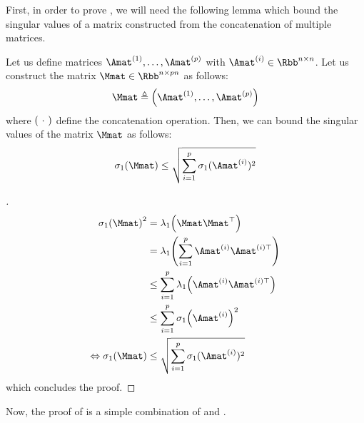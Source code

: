 First, in order to prove , we will need the following lemma which bound the singular values of a matrix constructed from the concatenation of multiple matrices.
\begin{lemma} \label{theorem:ch2-bound_concatenation_matrices}
  Let us define matrices $\Amat^{(1)}, \dots, \Amat^{(p)}$ with $\Amat^{(i)} \in \Rbb^{n \times n}$. Let us construct the matrix $\Mmat \in \Rbb^{n \times pn}$ as follows:
  \begin{equation}
    \Mmat \triangleq \leftmat \Amat^{(1)}, \dots, \Amat^{(p)} \rightmat
  \end{equation}
  where $\leftmat\ \cdot\ \rightmat$ define the concatenation operation. Then, we can bound the singular values of the matrix $\Mmat$ as follows:
  \begin{equation}
    \sigma_1(\Mmat) \leq \sqrt{\sum_{i=1}^p \sigma_1(\Amat^{(i)})^2}
  \end{equation}
\end{lemma}

\begingroup
\allowdisplaybreaks
\addtolength{\jot}{1.5em}

\begin{proof}[]
  \begin{align}
    \sigma_1\left(\Mmat\right)^2 &= \lambda_1\left(\Mmat \Mmat^\top\right) \\
    &= \lambda_1\left( \sum_{i=1}^p\Amat^{(i)} \Amat^{(i)\top}  \right) \\
    &\leq \sum_{i=1}^p \lambda_1\left( \Amat^{(i)} \Amat^{(i)\top}  \right) \\
    &\leq \sum_{i=1}^p \sigma_1\left( \Amat^{(i)} \right)^2 \\
    \Leftrightarrow \sigma_1\left(\Mmat\right) &\leq \sqrt{\sum_{i=1}^p \sigma_1(\Amat^{(i)})^2}
  \end{align}
  which concludes the proof.
\end{proof}

\noindent
Now, the proof of  is a simple combination of  and .

